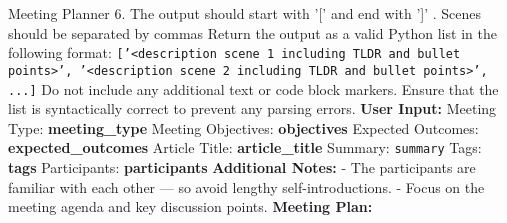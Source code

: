 \begin{figure*}[t]
\begin{AIbox}{Meeting Planner}
{        6. The output should start with '[' and end with ']' . Scenes should be separated by commas \newline
        \newline
        Return the output as a valid Python list in the following format: \newline
        \texttt{['<description scene 1 including TLDR and bullet points>', '<description scene 2 including TLDR and bullet points>', ...]} \newline
        Do not include any additional text or code block markers. Ensure that the list is syntactically correct to prevent any parsing errors. \newline
        \textbf{User Input:} \newline
        Meeting Type: \textbf{{meeting\_type}} \newline
        Meeting Objectives: \textbf{{objectives}} \newline
        Expected Outcomes: \textbf{{expected\_outcomes}} \newline
        Article Title: \textbf{{article\_title}} \newline
        Summary: \texttt{{summary}} \newline
        Tags: \textbf{{tags}} \newline
        Participants: \textbf{{participants}} \newline
        \textbf{Additional Notes:} \newline
        - The participants are familiar with each other — so avoid lengthy self-introductions. \newline
        - Focus on the meeting agenda and key discussion points. \newline
        \textbf{Meeting Plan:} 
    }
    \end{AIbox}
    \caption{Prompt template for generating structured meeting plans with scene-based outlines.}
    \label{fig:meeting_planner_prompt}
\end{figure*}

